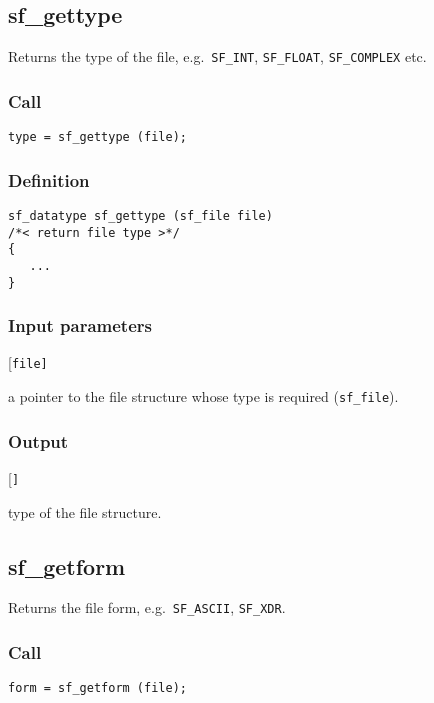 \subsection{{sf\_gettype}}
Returns the type of  the file, e.g.~\texttt{SF\_INT}, \texttt{SF\_FLOAT}, \texttt{SF\_COMPLEX} etc.

\subsubsection*{Call}
\begin{verbatim}type = sf_gettype (file);\end{verbatim}

\subsubsection*{Definition}
\begin{verbatim}
sf_datatype sf_gettype (sf_file file)
/*< return file type >*/
{
   ...
}
\end{verbatim}

\subsubsection*{Input parameters}
\begin{desclist}{\tt }{\quad}[\tt file]
   \setlength\itemsep{0pt}
   \item[file] a pointer to the file structure whose type is required (\texttt{sf\_file}).  
\end{desclist}

\subsubsection*{Output}
\begin{desclist}{\tt }{\quad}[\tt ]
   \setlength\itemsep{0pt}
   \item[file->type] type of the file structure.
\end{desclist}




\subsection{{sf\_getform}}
Returns the file form, e.g.~\texttt{SF\_ASCII}, \texttt{SF\_XDR}.

\subsubsection*{Call}
\begin{verbatim}form = sf_getform (file);\end{verbatim}

